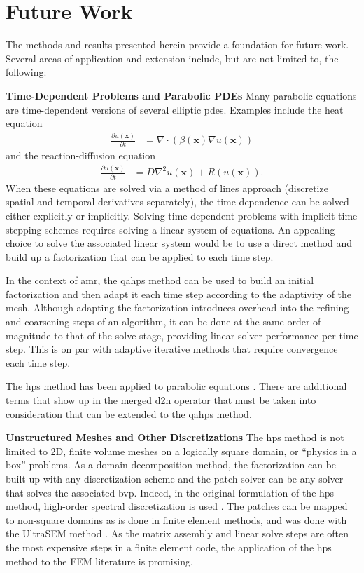\section{Future Work}
\label{sec:future-work}

The methods and results presented herein provide a foundation for future work. Several areas of application and extension include, but are not limited to, the following:

{\bf Time-Dependent Problems and Parabolic PDEs}
Many parabolic equations are time-dependent versions of several elliptic \gls{pdes}. Examples include the heat equation
\begin{align}
    \frac{\partial u(\textbf{x})}{\partial t} &= \nabla \cdot \left( \beta(\textbf{x}) \nabla u(\textbf{x}) \right)
\end{align}
and the reaction-diffusion equation
\begin{align}
    \frac{\partial u(\textbf{x})}{\partial t} &= D \nabla^2 u(\textbf{x}) + R(u(\textbf{x})).
\end{align}
When these equations are solved via a method of lines approach (discretize spatial and temporal derivatives separately), the time dependence can be solved either explicitly or implicitly. Solving time-dependent problems with implicit time stepping schemes requires solving a linear system of equations. An appealing choice to solve the associated linear system would be to use a direct method and build up a factorization that can be applied to each time step.

In the context of \gls{amr}, the \gls{qahps} method can be used to build an initial factorization and then adapt it each time step according to the adaptivity of the mesh. Although adapting the factorization introduces overhead into the refining and coarsening steps of an algorithm, it can be done at the same order of magnitude to that of the solve stage, providing linear solver performance per time step. This is on par with adaptive iterative methods that require convergence each time step.

The \gls{hps} method has been applied to parabolic equations \citep{babb2018hps}. There are additional terms that show up in the merged \gls{d2n} operator that must be taken into consideration that can be extended to the \gls{qahps} method.

{\bf Unstructured Meshes and Other Discretizations}
The \gls{hps} method is not limited to 2D, finite volume meshes on a logically square domain, or ``physics in a box'' problems. As a domain decomposition method, the factorization can be built up with any discretization scheme and the patch solver can be any solver that solves the associated \gls{bvp}. Indeed, in the original formulation of the \gls{hps} method, high-order spectral discretization is used \citep{gillman2014direct}. The patches can be mapped to non-square domains as is done in finite element methods, and was done with the UltraSEM method \citep{fortunato2020ultraspherical}. As the matrix assembly and linear solve steps are often the most expensive steps in a finite element code, the application of the \gls{hps} method to the FEM literature is promising.

